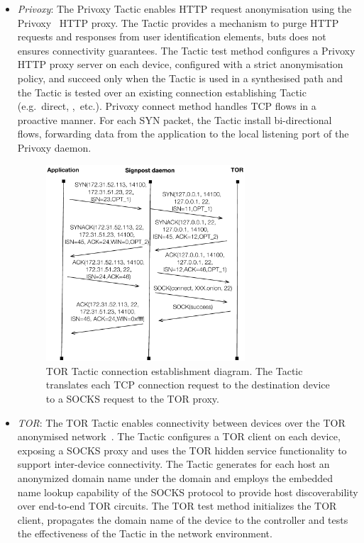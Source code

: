 \begin{itemize}
  \item \emph{Privoxy}: The Privoxy Tactic enables HTTP request anonymisation using the
    Privoxy~ HTTP proxy. The Tactic provides a mechanism to purge
    HTTP requests and responses from user identification elements, buts does not
    ensures connectivity guarantees. The Tactic test method
    configures a Privoxy HTTP proxy server on each device, configured with a
    strict anonymisation policy, and succeed only when the Tactic is used in a
    synthesised path and the Tactic is tested over an existing connection
    establishing Tactic (e.g.~direct, \openvpn,~etc.).  Privoxy connect method
    handles TCP flows in a proactive manner.  For each
    SYN packet, the Tactic install bi-directional flows, forwarding data from
    the application to the local listening port of the Privoxy daemon.

\begin{figure}
  \begin{center}
	\includegraphics[width=0.7\textwidth]{tor-example}
  \end{center}
  \caption[TOR Tactic connection establishment sequence diagram.]{TOR Tactic
    connection establishment diagram. The Tactic translates each
    TCP connection request to the destination device to a SOCKS
    request to the TOR proxy.}\label{fig:signpost:tor-example}
\end{figure}
  
  \item \emph{TOR}: The TOR Tactic enables connectivity between devices over the
    TOR anonymised network~. The Tactic configures a TOR
    client on each device, exposing a SOCKS proxy and uses the TOR hidden
    service functionality to support inter-device connectivity. The Tactic
    generates for each host an anonymized domain name under the 
    domain and employs the embedded name lookup capability of the SOCKS protocol
    to provide host discoverability over end-to-end TOR circuits. The TOR test
    method initializes the TOR client, propagates the domain name of the device
    to the \signpost controller and tests the effectiveness of the Tactic in the network
    environment.  
    

\end{itemize}
